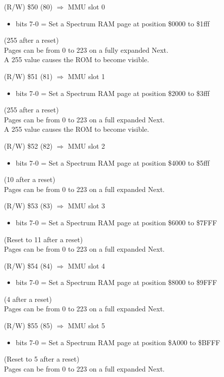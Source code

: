 (R/W) \$50 (80) $\Rightarrow$ MMU slot 0
\begin{itemize}
\item[] bits 7-0 = Set a Spectrum RAM page at position \$0000 to \$1fff
\end{itemize}
(255 after a reset)\\
Pages can be from 0 to 223 on a fully expanded Next.\\
A 255 value causes the ROM to become visible.

(R/W) \$51 (81) $\Rightarrow$ MMU slot 1
\begin{itemize}
\item[] bits 7-0 = Set a Spectrum RAM page at position \$2000 to \$3fff
\end{itemize}
(255 after a reset)\\
Pages can be from 0 to 223 on a full expanded Next.\\
A 255 value causes the ROM to become visible.

(R/W) \$52 (82) $\Rightarrow$ MMU slot 2
\begin{itemize}
\item[] bits 7-0 = Set a Spectrum RAM page at position \$4000 to \$5fff
\end{itemize}
(10 after a reset)\\
Pages can be from 0 to 223 on a full expanded Next.

(R/W) \$53 (83) $\Rightarrow$ MMU slot 3
\begin{itemize}
\item[] bits 7-0 = Set a Spectrum RAM page at position \$6000 to \$7FFF
\end{itemize}
(Reset to 11 after a reset)\\
Pages can be from 0 to 223 on a full expanded Next.

(R/W) \$54 (84) $\Rightarrow$ MMU slot 4
\begin{itemize}
\item[] bits 7-0 = Set a Spectrum RAM page at position \$8000 to \$9FFF
\end{itemize}
(4 after a reset)\\
Pages can be from 0 to 223 on a full expanded Next.

(R/W) \$55 (85) $\Rightarrow$ MMU slot 5
\begin{itemize}
\item[] bits 7-0 = Set a Spectrum RAM page at position \$A000 to \$BFFF
\end{itemize}
(Reset to 5 after a reset)\\
Pages can be from 0 to 223 on a full expanded Next.

